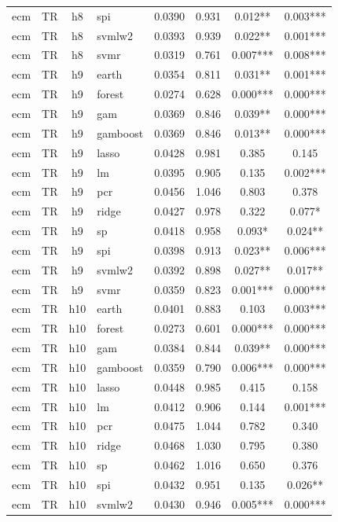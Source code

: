 \begin{ThreePartTable}
\begin{longtable}[t]{llclcccc}
ecm & TR & h8 & spi & 0.0390 & 0.931 & 0.012** & 0.003***\\
ecm & TR & h8 & svmlw2 & 0.0393 & 0.939 & 0.022** & 0.001***\\
ecm & TR & h8 & svmr & 0.0319 & 0.761 & 0.007*** & 0.008***\\
\addlinespace
ecm & TR & h9 & earth & 0.0354 & 0.811 & 0.031** & 0.001***\\
ecm & TR & h9 & forest & 0.0274 & 0.628 & 0.000*** & 0.000***\\
ecm & TR & h9 & gam & 0.0369 & 0.846 & 0.039** & 0.000***\\
ecm & TR & h9 & gamboost & 0.0369 & 0.846 & 0.013** & 0.000***\\
ecm & TR & h9 & lasso & 0.0428 & 0.981 & 0.385 & 0.145\\
ecm & TR & h9 & lm & 0.0395 & 0.905 & 0.135 & 0.002***\\
ecm & TR & h9 & pcr & 0.0456 & 1.046 & 0.803 & 0.378\\
ecm & TR & h9 & ridge & 0.0427 & 0.978 & 0.322 & 0.077*\\
ecm & TR & h9 & sp & 0.0418 & 0.958 & 0.093* & 0.024**\\
ecm & TR & h9 & spi & 0.0398 & 0.913 & 0.023** & 0.006***\\
ecm & TR & h9 & svmlw2 & 0.0392 & 0.898 & 0.027** & 0.017**\\
ecm & TR & h9 & svmr & 0.0359 & 0.823 & 0.001*** & 0.000***\\
\addlinespace
ecm & TR & h10 & earth & 0.0401 & 0.883 & 0.103 & 0.003***\\
ecm & TR & h10 & forest & 0.0273 & 0.601 & 0.000*** & 0.000***\\
ecm & TR & h10 & gam & 0.0384 & 0.844 & 0.039** & 0.000***\\
ecm & TR & h10 & gamboost & 0.0359 & 0.790 & 0.006*** & 0.000***\\
ecm & TR & h10 & lasso & 0.0448 & 0.985 & 0.415 & 0.158\\
ecm & TR & h10 & lm & 0.0412 & 0.906 & 0.144 & 0.001***\\
ecm & TR & h10 & pcr & 0.0475 & 1.044 & 0.782 & 0.340\\
ecm & TR & h10 & ridge & 0.0468 & 1.030 & 0.795 & 0.380\\
ecm & TR & h10 & sp & 0.0462 & 1.016 & 0.650 & 0.376\\
ecm & TR & h10 & spi & 0.0432 & 0.951 & 0.135 & 0.026**\\
ecm & TR & h10 & svmlw2 & 0.0430 & 0.946 & 0.005*** & 0.000***\\

\end{longtable}
\end{ThreePartTable}

